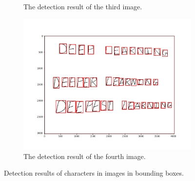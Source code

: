 \documentclass[11pt]{article}
\begin{document}
\begin{figure}[h!]
\begin{subfigure}{.495\textwidth}
      \caption{The detection result of the third image. }
    \end{subfigure}
    \begin{subfigure}{.495\textwidth}
      \centering
      \includegraphics[width=.9\linewidth]{../results/q4_3_4.png}
      \caption{The detection result of the fourth image. }
    \end{subfigure}\hfill
    \caption{Detection results of characters in images in bounding boxes. }
    \label{fig:q4.3}
\end{figure}
\end{document}

